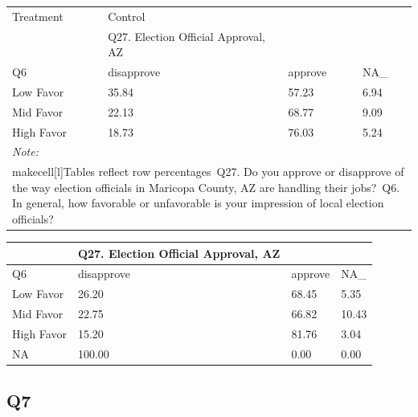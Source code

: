\documentclass[
  11pt,
  a4paper,
]{article}
\begin{document}
\begin{table}
\centering
\centering
\begin{tabular}[t]{l|l|l|l}
\hline
\multicolumn{1}{l|}{Treatment} & \multicolumn{1}{l}{Control} \\
\cline{1-1} \cline{2-2}
 & Q27. Election Official Approval, AZ &  & \\
\hline
Q6 & disapprove & approve & NA\_\\
\hline
Low Favor & 35.84 & 57.23 & 6.94\\
\hline
Mid Favor & 22.13 & 68.77 & 9.09\\
\hline
High Favor & 18.73 & 76.03 & 5.24\\
\hline
\multicolumn{4}{l}{\rule{0pt}{1em}\textit{Note: }}\\
\multicolumn{4}{l}{\rule{0pt}{1em}makecell[l]{Tables reflect row percentages\ Q27. Do you approve or disapprove of the way election officials in Maricopa County, AZ are handling their jobs?\ Q6. In general, how favorable or unfavorable is your impression of local election officials?}}\\
\end{tabular}
\centering
\begin{tabular}[t]{l|l|l|l}
\hline
 & Q27. Election Official Approval, AZ &  & \\
\hline
Q6 & disapprove & approve & NA\_\\
\hline
Low Favor & 26.20 & 68.45 & 5.35\\
\hline
Mid Favor & 22.75 & 66.82 & 10.43\\
\hline
High Favor & 15.20 & 81.76 & 3.04\\
\hline
NA & 100.00 & 0.00 & 0.00\\
\hline
\end{tabular}
\end{table}

\subsection{Q7}\label{q7}
\end{document}
